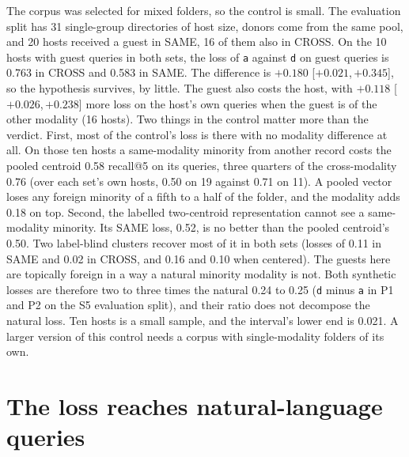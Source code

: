 \documentclass[11pt]{article}
\newcommand{\rep}[1]{\texttt{#1}}
\newcommand{\ci}[2]{[\ensuremath{#1},\,\ensuremath{#2}]}  %
\begin{document}
The corpus was selected for mixed folders, so the control is small. The evaluation split has 31 single-group directories of host size, donors come from the same pool, and 20 hosts received a guest in SAME, 16 of them also in CROSS. On the 10 hosts with guest queries in both sets, the loss of \rep{a} against \rep{d} on guest queries is 0.763 in CROSS and 0.583 in SAME. The difference is $+0.180$ \ci{+0.021}{+0.345}, so the hypothesis survives, by little. The guest also costs the host, with $+0.118$ \ci{+0.026}{+0.238} more loss on the host's own queries when the guest is of the other modality (16 hosts). Two things in the control matter more than the verdict. First, most of the control's loss is there with no modality difference at all. On those ten hosts a same-modality minority from another record costs the pooled centroid 0.58 recall@5 on its queries, three quarters of the cross-modality 0.76 (over each set's own hosts, 0.50 on 19 against 0.71 on 11). A pooled vector loses any foreign minority of a fifth to a half of the folder, and the modality adds 0.18 on top. Second, the labelled two-centroid representation cannot see a same-modality minority. Its SAME loss, 0.52, is no better than the pooled centroid's 0.50. Two label-blind clusters recover most of it in both sets (losses of 0.11 in SAME and 0.02 in CROSS, and 0.16 and 0.10 when centered). The guests here are topically foreign in a way a natural minority modality is not. Both synthetic losses are therefore two to three times the natural 0.24 to 0.25 (\rep{d} minus \rep{a} in P1 and P2 on the S5 evaluation split), and their ratio does not decompose the natural loss. Ten hosts is a small sample, and the interval's lower end is 0.021. A larger version of this control needs a corpus with single-modality folders of its own.

\section{The loss reaches natural-language queries}
\label{sec:nlq}
\end{document}
